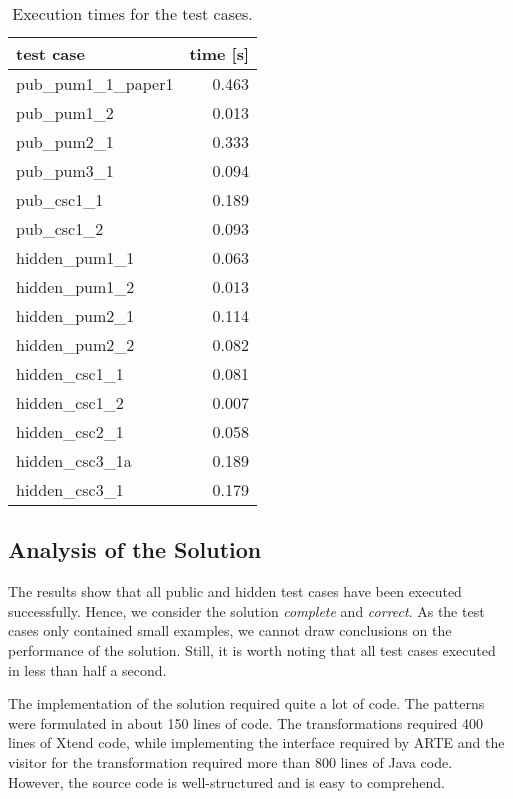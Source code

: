 \documentclass[submission,copyright,creativecommons]{eptcs}
\begin{document}
\begin{table}[!htb]
\centering
\footnotesize
\begin{tabular}{| l | r |}
\hline
\bf test case & \bf time [s]\\\hline\hline
\sf pub\_pum1\_1\_paper1 & 0.463 \\\hline
\sf pub\_pum1\_2 & 0.013 \\\hline
\sf pub\_pum2\_1 & 0.333 \\\hline
\sf pub\_pum3\_1 & 0.094 \\\hline
\sf pub\_csc1\_1 & 0.189 \\\hline
\sf pub\_csc1\_2 & 0.093 \\\hline
\sf hidden\_pum1\_1 & 0.063 \\\hline
\sf hidden\_pum1\_2 & 0.013 \\\hline
\sf hidden\_pum2\_1 & 0.114 \\\hline
\sf hidden\_pum2\_2 & 0.082 \\\hline
\sf hidden\_csc1\_1 & 0.081 \\\hline
\sf hidden\_csc1\_2 & 0.007 \\\hline
\sf hidden\_csc2\_1 & 0.058 \\\hline
\sf hidden\_csc3\_1a & 0.189 \\\hline
\sf hidden\_csc3\_1 & 0.179 \\\hline

\end{tabular}\caption{Execution times for the test cases.}
\label{tab:execution-times}
\end{table}

\subsection{Analysis of the Solution}

The results show that all public and hidden test cases have been executed successfully. Hence, we consider the solution \emph{complete} and \emph{correct}. As the test cases only contained small examples, we cannot draw conclusions on the performance of the solution. Still, it is worth noting that all test cases executed in less than half a second.

The implementation of the solution required quite a lot of code. The patterns were formulated in about 150 lines of \iqpl code. The transformations required 400 lines of Xtend code, while implementing the interface required by ARTE and the visitor for the transformation required more than 800 lines of Java code. However, the source code is well-structured and is easy to comprehend.
\end{document}
